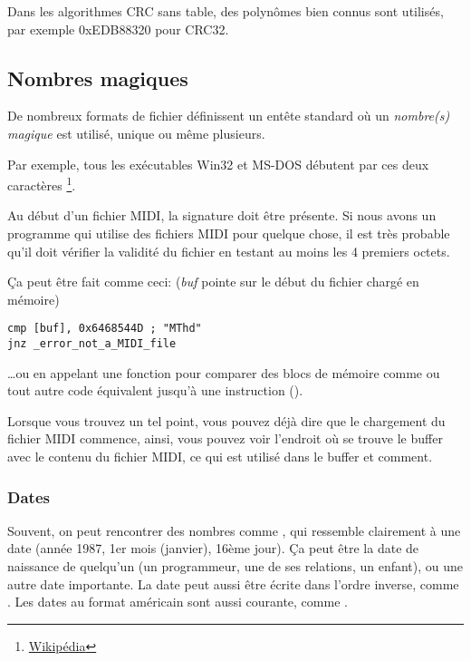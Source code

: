 Dans les algorithmes CRC sans table, des polynômes bien connus sont utilisés, par
exemple 0xEDB88320 pour CRC32.

\subsection{Nombres magiques}
\label{magic_numbers}

De nombreux formats de fichier définissent un entête standard où un \emph{nombre(s) magique}
est utilisé, unique ou même plusieurs.


Par exemple, tous les exécutables Win32 et MS-DOS débutent par ces deux caractères \footnote{\href{http://go.yurichev.com/17113}{Wikipédia}}.


Au début d'un fichier MIDI, la signature  doit être présente.
Si nous avons un programme qui utilise des fichiers MIDI pour quelque chose, il
est très probable qu'il doit vérifier la validité du fichier en testant au moins
les 4 premiers octets.

Ça peut être fait comme ceci:
(\emph{buf} pointe sur le début du fichier chargé en mémoire)

\begin{lstlisting}[style=customasmx86]
cmp [buf], 0x6468544D ; "MThd"
jnz _error_not_a_MIDI_file
\end{lstlisting}


\dots ou en appelant une fonction pour comparer des blocs de mémoire comme 
ou tout autre code équivalent jusqu'à une instruction  ().

Lorsque vous trouvez un tel point, vous pouvez déjà dire que le chargement du fichier
MIDI commence, ainsi, vous pouvez voir l'endroit où se trouve le buffer avec le contenu
du fichier MIDI, ce qui est utilisé dans le buffer et comment.

\subsubsection{Dates}


Souvent, on peut rencontrer des nombres comme , qui ressemble clairement
à une date (année 1987, 1er mois (janvier), 16ème jour).
Ça peut être la date de naissance de quelqu'un (un programmeur, une de ses relations,
un enfant), ou une autre date importante.
La date peut aussi être écrite dans l'ordre inverse, comme .
Les dates au format américain sont aussi courante, comme .

